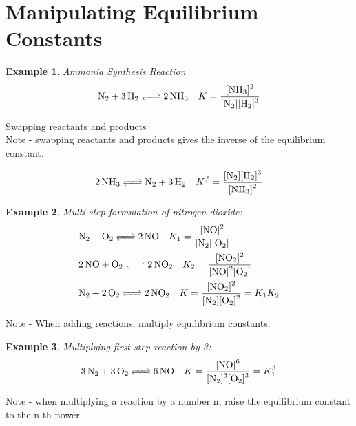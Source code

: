 \documentclass{article}  %
\newtheorem{exmp}{Example}
\begin{document}
\section*{Manipulating Equilibrium Constants}
\begin{exmp}
    Ammonia Synthesis Reaction 
    \begin{equation*}
        \begin{aligned}
            \ce{N2 + 3 H2 <=> 2 NH3} \quad K = \ce{\frac{[NH3]^2}{[N2][H2]^3}}
        \end{aligned}
    \end{equation*}
\end{exmp}
Swapping reactants and products \\
Note - swapping reactants and products gives the inverse of the equilibrium constant.

\begin{equation*}
    \begin{aligned}
        \ce{2 NH3 <=> N2 + 3 H2} \quad K^f = \ce{\frac{[N2][H2]^3}{[NH3]^2}}
    \end{aligned}
\end{equation*}

\begin{exmp}
    Multi-step formulation of nitrogen dioxide: 
    \begin{equation*}
        \begin{aligned}
            &\ce{N2 + O2 <=> 2 NO} \quad K_1 = \ce{\frac{[NO]^2}{[N2][O2]}} \\
            &\ce{2 NO + O2 <=> 2 NO2} \quad K_2 = \ce{\frac{[NO2]^2}{[NO]^2[O2]}} \\
            &\ce{N2 + 2 O2 <=> 2 NO2} \quad K = \ce{\frac{[NO2]^2}{[N2][O2]^2}} = K_1K_2
        \end{aligned}
    \end{equation*}
\end{exmp}
Note - When adding reactions, multiply equilibrium constants.

\begin{exmp}
    Multiplying first step reaction by 3: 
    \begin{equation*}
        \begin{aligned}
            &\ce{3N2 + 3O2 <=> 6 NO} \quad K = \ce{\frac{[NO]^6}{[N2]^3[O2]^3}} = K_1^3 \\
        \end{aligned}
    \end{equation*}
\end{exmp}
Note - when multiplying a reaction by a number n, raise the equilibrium constant to the n-th power.
\end{document}
